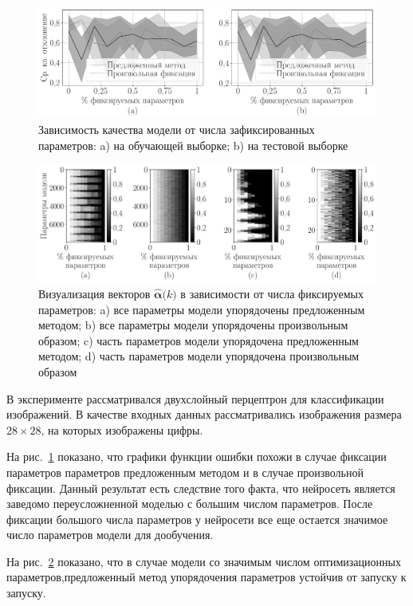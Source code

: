 \begin{figure}[h!t]\center
\includegraphics[width=1\textwidth]{results/order/mnist_data_loss}
\caption{Зависимость качества модели от числа зафиксированных параметров: a) на обучающей выборке; b) на тестовой выборке}
\label{fg:ex:mnist:1}
\end{figure}

\begin{figure}[h!t]\center
\includegraphics[width=1\textwidth]{results/order/mnist_data_matshow}
\caption{Визуализация векторов $\hat{\bm{\alpha}}\bigr(k\bigr)$ в зависимости от числа фиксируемых параметров: a) все параметры модели упорядочены предложенным методом; b) все параметры модели упорядочены произвольным образом; c) часть параметров модели упорядочена предложенным методом; d) часть параметров модели упорядочена произвольным образом}
\label{fg:ex:mnist:2}
\end{figure}

В эксперименте рассматривался двухслойный перцептрон для классификации изображений. В качестве входных данных рассматривались изображения размера $28\times28$, на которых изображены цифры. 

На рис.~\ref{fg:ex:mnist:1} показано, что графики функции ошибки похожи в случае фиксации параметров параметров предложенным методом и в случае произвольной фиксации. Данный результат есть следствие того факта, что нейросеть является заведомо переусложненной моделью с большим числом параметров. После фиксации большого числа параметров у нейросети все еще остается значимое число параметров модели для дообучения.

На рис.~\ref{fg:ex:mnist:2} показано, что в случае модели со значимым числом оптимизационных параметров,предложенный метод упорядочения параметров устойчив от запуску к запуску.

